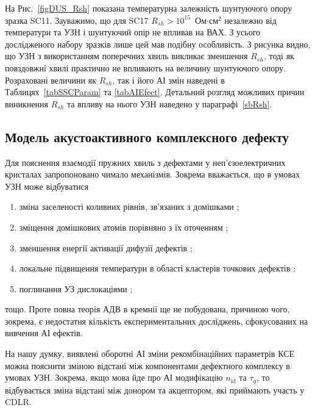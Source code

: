 На Рис.~\ref{figDUS_Rsh} показана температурна залежність шунтуючого опору зразка SC11.
Зауважимо, що для SC17 $R_{sh}>10^{15}$~Ом$\cdot$см$^2$ незалежно від температури та УЗН і
шунтуючий опір не впливав на ВАХ.
З усього дослідженого набору зразків лише цей мав подібну особливість.
З рисунка видно, що УЗН з використанням поперечних хвиль викликає зменшення $R_{sh}$,
тоді як повздовжні хвилі практично не впливають на величину шунтуючого опору.
Розраховані величини як $R_{sh}$, так і його АІ змін наведені в Таблицях~\ref{tabSSCParam} та \ref{tabAIEfect}.
Детальний розгляд можливих причин виникнення $R_{sh}$ та впливу на нього УЗН наведено у параграфі~\ref{sbRsh}.

\subsection{Модель акустоактивного комплексного дефекту\label{sbAEDefect}}

Для пояснення взаємодії пружних хвиль з дефектами у неп'єзоелектричних кристалах
запропоновано чимало механізмів.
Зокрема вважається, що в умовах УЗН може відбуватися
\begin{enumerate}[label=\asbuk*),leftmargin=0em,itemindent=1.5em]
\item зміна заселеності коливних рівнів, зв'язаних з домішками \cite{Pavlovich};
\item зміщення домішкових атомів порівняно з їх оточенням \cite{Korotchenkov1995,MirzadeR,MirzadeJAP2011,PELESHCHAK:UPJ2016};
\item зменшення енергії активації дифузії дефектів \cite{Krevchik};
\item локальне підвищення температури в області кластерів точкових дефектів  \cite{MirzadeJAP2005};
\item поглинання УЗ дислокаціями \cite{Davletova2008,OstrovKor92};
\end{enumerate}
тощо.
Проте повна теорія АДВ в кремнії ще не побудована, причиною чого, зокрема, є недостатня
кількість експериментальних досліджень, сфокусованих на вивчення АІ ефектів.

На нашу думку, виявлені оборотні АІ зміни рекомбінаційних параметрів КСЕ можна пояснити зміною
відстані між компонентами дефектного комплексу в умовах УЗН.
Зокрема, якщо мова йде про АІ модифікацію $n_{\mathrm{id}}$ та $\tau_g$,
то відбувається зміна відстані між донором та акцептором, які приймають участь у CDLR.

